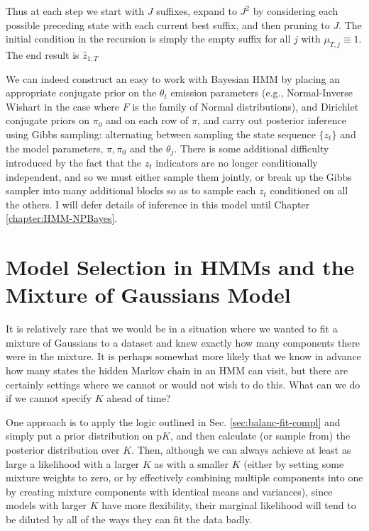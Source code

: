   Thus at each step we start with $J$ suffixes, expand to $J^2$ by
  considering each possible preceding state with each current best
  suffix, and then pruning to $J$.  The initial condition in the
  recursion is simply the empty suffix for all $j$ with $\mu_{T,j}
  \equiv 1$.  The end result is $\hat{z}_{1:T}$

We can indeed construct an easy to work with Bayesian HMM by placing an appropriate 
conjugate prior on the $\theta_t$ emission parameters (e.g.,
Normal-Inverse Wishart in the case where $F$ is the family of Normal
distributions), and Dirichlet conjugate priors on $\pi_0$ and 
on each row of $\pi$, and carry out posterior inference using Gibbs
sampling: alternating between sampling the state sequence $\{z_t\}$
and the model parameters, $\pi, \pi_0$ and the $\theta_j$.  There is
some additional difficulty introduced by the fact that the $z_t$
indicators are no longer conditionally independent, and so we must
either sample them jointly, or break up the Gibbs sampler into
many additional blocks so as to sample each $z_t$ conditioned on all
the others.  I will defer details of inference in this model until
Chapter \ref{chapter:HMM-NPBayes}.


\section{Model Selection in HMMs and the Mixture of Gaussians Model}
\label{sec:model-select-mixt}

It is relatively rare that we would be in a situation where we wanted
to fit a mixture of Gaussians to a dataset and knew exactly how many
components there were in the mixture.  It is perhaps somewhat more
likely that we know in advance how many
states the hidden Markov chain in an HMM can visit, but there are
certainly settings where we cannot or would not wish to do this. 
What can we do if we cannot specify $K$ ahead of time?

One approach is to apply the logic outlined in
Sec. \ref{sec:balanc-fit-compl} and simply put a prior distribution on
p$K$, and then calculate (or sample from) the posterior distribution
over $K$.  Then, although we can always achieve at least as large a
likelihood with a larger $K$ as with a smaller $K$ (either by setting
some mixture weights to zero, or by effectively combining multiple
components into one by creating mixture components with
identical means and variances), since models with larger $K$ have more flexibility, their
marginal likelihood will tend to be diluted by all of the ways they can fit
the data badly.

